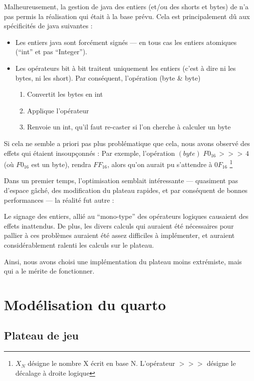 \documentclass{article}
\begin{document}
Malheureusement, la gestion de java des entiers (et/ou des shorts et bytes) de n'a
pas permis la réalisation qui était à la base prévu. Cela est
principalement dû aux spécificités de java suivantes :
\begin{itemize}
\item Les entiers java sont forcément signés --- en tous cas les
  entiers atomiques (``int'' et pas ``Integer'').
\item Les opérateurs bit à bit traitent uniquement les entiers
  (c'est à dire ni les bytes, ni les short). Par conséquent,
  l'opération (byte \& byte)
  \begin{enumerate}
  \item Convertit les bytes en int 
  \item Applique l'opérateur 
  \item Renvoie un int, qu'il faut re-caster si l'on cherche à calculer un byte
  \end{enumerate}
\end{itemize}
Si cela ne semble a priori pas plus problématique que cela, 
nous avons observé des effets qui étaient
insoupçonnés : Par exemple, l'opération
\((byte)  \; F0_{16} \, >>> \,4 \)  (o\`u \(F0_{16} \) est un byte), rendra
\( FF_{16} \), alors qu'on aurait pu s'attendre à \( 0F_{16} \)
\footnote{ \(X_{N}\) désigne le
  nombre X écrit en base N. L'opérateur \(>>>\) désigne le décalage à
  droite logique}


Dans un premier temps, l'optimisation semblait intéressante ---
quasiment pas d'espace gâché, des modification du plateau rapides, et
par conséquent de bonnes performances --- la réalité fut autre :


Le signage des entiers, allié au ``mono-type'' des opérateurs logiques 
causaient des effets inattendus.
De plus, les divers calculs qui
auraient été nécessaires pour pallier à ces problèmes auraient été
assez difficiles à implémenter, et auraient considérablement ralenti
les calculs sur le plateau.


Ainsi, nous avons choisi une implémentation du plateau moins
extrémiste, mais qui a le mérite de fonctionner.

\section{Modélisation du quarto}
\subsection{Plateau de jeu}
\end{document}
